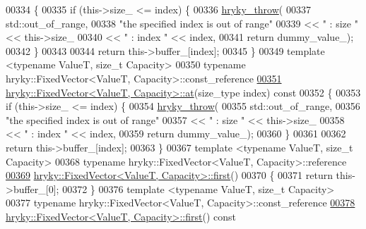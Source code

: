 \begin{DoxyCode}
00334 \{
00335     \textcolor{keywordflow}{if} (this->size\_ <= index) \{
00336         \hyperlink{debug__common_8h_af50606eac4009921527ddcaed392b2c2}{hryky_throw}(
00337             std::out\_of\_range,
00338             \textcolor{stringliteral}{"the specified index is out of range"}
00339             << \textcolor{stringliteral}{" : size "} << this->size\_
00340             << \textcolor{stringliteral}{" : index "} << index,
00341             \textcolor{keywordflow}{return} dummy\_value\_);
00342     \}
00343     
00344     \textcolor{keywordflow}{return} this->buffer\_[index];
00345 \}
00349 \textcolor{keyword}{template} <\textcolor{keyword}{typename} ValueT, \textcolor{keywordtype}{size\_t} Capacity>
00350 \textcolor{keyword}{typename} hryky::FixedVector<ValueT, Capacity>::const\_reference
\hypertarget{fixed__vector_8h_source_l00351}{}\hyperlink{classhryky_1_1_fixed_vector_adbb832c67227fbd95ede014e34ca0d55}{00351} \hyperlink{classhryky_1_1_fixed_vector}{hryky::FixedVector<ValueT, Capacity>::at}(size\_type index)\textcolor{keyword}{ const}
00352 \textcolor{keyword}{}\{
00353     \textcolor{keywordflow}{if} (this->size\_ <= index) \{
00354         \hyperlink{debug__common_8h_af50606eac4009921527ddcaed392b2c2}{hryky_throw}(
00355             std::out\_of\_range,
00356             \textcolor{stringliteral}{"the specified index is out of range"}
00357             << \textcolor{stringliteral}{" : size "} << this->size\_
00358             << \textcolor{stringliteral}{" : index "} << index,
00359             \textcolor{keywordflow}{return} dummy\_value\_);
00360     \}
00361     
00362     \textcolor{keywordflow}{return} this->buffer\_[index];
00363 \}
00367 \textcolor{keyword}{template} <\textcolor{keyword}{typename} ValueT, \textcolor{keywordtype}{size\_t} Capacity>
00368 \textcolor{keyword}{typename} hryky::FixedVector<ValueT, Capacity>::reference
\hypertarget{fixed__vector_8h_source_l00369}{}\hyperlink{classhryky_1_1_fixed_vector_a1133d189d2a155830e739d20450e1b40}{00369} \hyperlink{classhryky_1_1_fixed_vector}{hryky::FixedVector<ValueT, Capacity>::first}()
00370 \{
00371     \textcolor{keywordflow}{return} this->buffer\_[0];
00372 \}
00376 \textcolor{keyword}{template} <\textcolor{keyword}{typename} ValueT, \textcolor{keywordtype}{size\_t} Capacity>
00377 \textcolor{keyword}{typename} hryky::FixedVector<ValueT, Capacity>::const\_reference
\hypertarget{fixed__vector_8h_source_l00378}{}\hyperlink{classhryky_1_1_fixed_vector_a5b781416618b956fddd0f08b614b2c79}{00378} \hyperlink{classhryky_1_1_fixed_vector}{hryky::FixedVector<ValueT, Capacity>::first}()\textcolor{keyword}{ const}

\end{DoxyCode}
